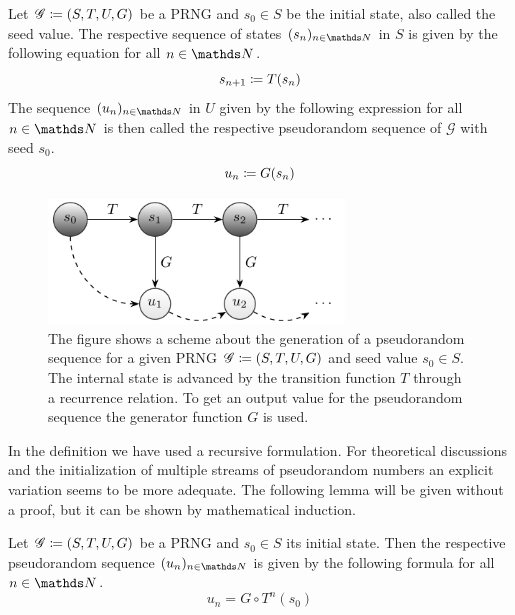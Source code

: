 \documentclass{stdlocal}
\begin{document}
  \begin{definition}
    Let $\mathscr{G}\coloneqq (S,T,U,G)$ be a PRNG and $s_0\in S$ be the initial state, also called the seed value.
    The respective sequence of states $(s_n)_{n\in\setNatural}$ in $S$ is given by the following equation for all $n\in\setNatural$.
    \[
      s_{n+1} \coloneqq T(s_n)
    \]
    The sequence $(u_n)_{n\in\setNatural}$ in $U$ given by the following expression for all $n\in\setNatural$ is then called the respective pseudorandom sequence of $\mathscr{G}$ with seed $s_0$.
    \[
      u_n \coloneqq G(s_n)
    \]
  \end{definition}
  \begin{figure}
    \center
    \includegraphics[width=0.7\textwidth]{figures/sequence_generation_scheme.pdf}
    \caption[Generation of a Pseudorandom Sequence]{%
      The figure shows a scheme about the generation of a pseudorandom sequence for a given PRNG $\mathscr{G}\coloneqq (S,T,U,G)$ and seed value $s_0\in S$.
      The internal state is advanced by the transition function $T$ through a recurrence relation.
      To get an output value for the pseudorandom sequence the generator function $G$ is used.
    }
    \label{fig:scheme-pseudorandom-sequence}
  \end{figure}
  In the definition we have used a recursive formulation.
  For theoretical discussions and the initialization of multiple streams of pseudorandom numbers an explicit variation seems to be more adequate.
  The following lemma will be given without a proof, but it can be shown by mathematical induction.

  \begin{lemma}
  \label{lemma:explicit-formulation-pseudorandom-sequence}
    Let $\mathscr{G}\coloneqq (S,T,U,G)$ be a PRNG and $s_0\in S$ its initial state.
    Then the respective pseudorandom sequence $(u_n)_{n\in\setNatural}$ is given by the following formula for all $n\in\setNatural$.
    \[
      u_n = G\circ T^{n}(s_0)
    \]
  \end{lemma}
\end{document}
